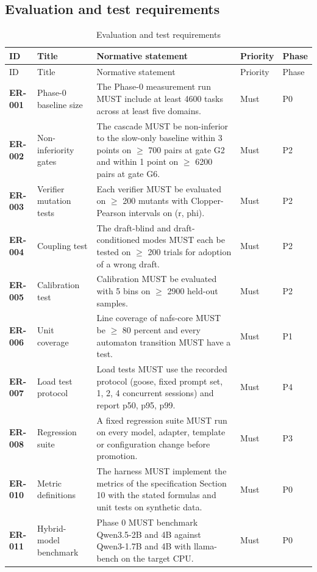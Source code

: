 \subsection{Evaluation and test requirements}
\begin{longtable}{@{}p{1.45cm}p{2.5cm}p{8.1cm}p{1.6cm}p{1.1cm}@{}}
\caption{Evaluation and test requirements}\\
\toprule ID & Title & Normative statement & Priority & Phase\\\midrule\endfirsthead
\toprule ID & Title & Normative statement & Priority & Phase\\\midrule\endhead
\bottomrule\endfoot
\textbf{ER-001} & Phase-0 baseline size & The Phase-0 measurement run MUST include at least 4600 tasks across at least five domains. & Must & P0\\
\textbf{ER-002} & Non-inferiority gates & The cascade MUST be non-inferior to the slow-only baseline within 3 points on $\ge$ 700 pairs at gate G2 and within 1 point on $\ge$ 6200 pairs at gate G6. & Must & P2\\
\textbf{ER-003} & Verifier mutation tests & Each verifier MUST be evaluated on $\ge$ 200 mutants with Clopper-Pearson intervals on (r, phi). & Must & P2\\
\textbf{ER-004} & Coupling test & The draft-blind and draft-conditioned modes MUST each be tested on $\ge$ 200 trials for adoption of a wrong draft. & Must & P2\\
\textbf{ER-005} & Calibration test & Calibration MUST be evaluated with 5 bins on $\ge$ 2900 held-out samples. & Must & P2\\
\textbf{ER-006} & Unit coverage & Line coverage of nafs-core MUST be $\ge$ 80 percent and every automaton transition MUST have a test. & Must & P1\\
\textbf{ER-007} & Load test protocol & Load tests MUST use the recorded protocol (goose, fixed prompt set, 1, 2, 4 concurrent sessions) and report p50, p95, p99. & Must & P4\\
\textbf{ER-008} & Regression suite & A fixed regression suite MUST run on every model, adapter, template or configuration change before promotion. & Must & P3\\
\textbf{ER-010} & Metric definitions & The harness MUST implement the metrics of the specification Section 10 with the stated formulas and unit tests on synthetic data. & Must & P0\\
\textbf{ER-011} & Hybrid-model benchmark & Phase 0 MUST benchmark Qwen3.5-2B and 4B against Qwen3-1.7B and 4B with llama-bench on the target CPU. & Must & P0\\

\end{longtable}
